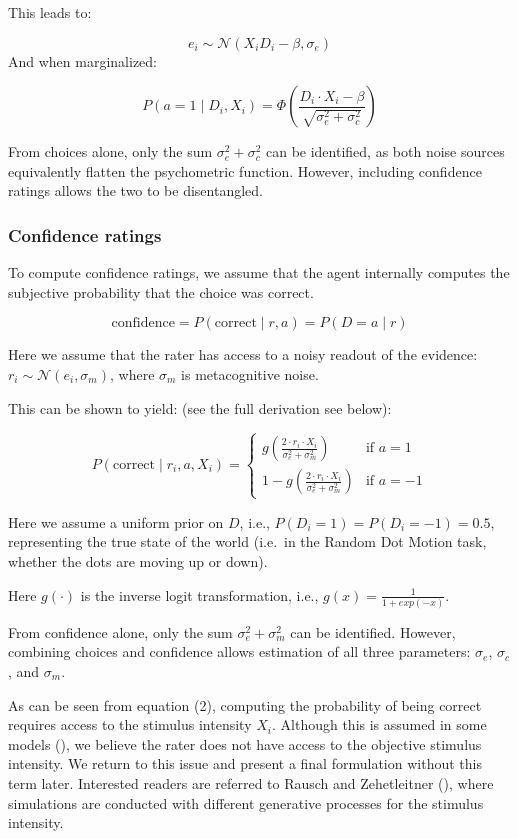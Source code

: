 \documentclass[
]{article}
\begin{document}
This leads to:

\[
e_i \sim \mathcal{N}(X_iD_i- \beta,\sigma_e)
\] And when marginalized:

\[
P(a = 1 \mid D_i, X_i) = \Phi\left(\frac{D_i \cdot X_i - \beta}{\sqrt{\sigma_e^2 + \sigma_c^2}}\right) \tag{1}
\]

From choices alone, only the sum \(\sigma_e^2 + \sigma_c^2\) can be
identified, as both noise sources equivalently flatten the psychometric
function. However, including confidence ratings allows the two to be
disentangled.

\subsubsection{Confidence ratings}\label{confidence-ratings-1}

To compute confidence ratings, we assume that the agent internally
computes the subjective probability that the choice was correct.

\[
\text{confidence} = P(\text{correct} \mid r, a) = P(D = a \mid r)
\]

Here we assume that the rater has access to a noisy readout of the
evidence: \(r_i \sim \mathcal{N}(e_i, \sigma_m)\), where \(\sigma_m\) is
metacognitive noise.

This can be shown to yield: (see the full derivation see below):

\[
P(\text{correct} \mid r_i, a, X_i) = \begin{cases}g\left(\frac{2 \cdot r_i \cdot X_i}{\sigma_e^2 + \sigma_m^2}\right) & \text{if } a = 1 \\ 1 - g\left(\frac{2 \cdot r_i \cdot X_i}{\sigma_e^2 + \sigma_m^2}\right) & \text{if } a = -1\end{cases} \tag{2}
\]

Here we assume a uniform prior on \(D\), i.e.,
\(P(D_i = 1) = P(D_i = -1) = 0.5\), representing the true state of the
world (i.e.~in the Random Dot Motion task, whether the dots are moving
up or down).

Here \(g(\cdot)\) is the inverse logit transformation, i.e.,
\(g(x)= \frac{1}{1+exp(-x)}\).

From confidence alone, only the sum \(\sigma_e^2 + \sigma_m^2\) can be
identified. However, combining choices and confidence allows estimation
of all three parameters: \(\sigma_e\), \(\sigma_c\), and \(\sigma_m\).

As can be seen from equation (2), computing the probability of being
correct requires access to the stimulus intensity \(X_i\). Although this
is assumed in some models
(), we believe the rater does not have access to
the objective stimulus intensity. We return to this issue and present a
final formulation without this term later. Interested readers are
referred to Rausch and Zehetleitner
(),
where simulations are conducted with different generative processes for
the stimulus intensity.
\end{document}
